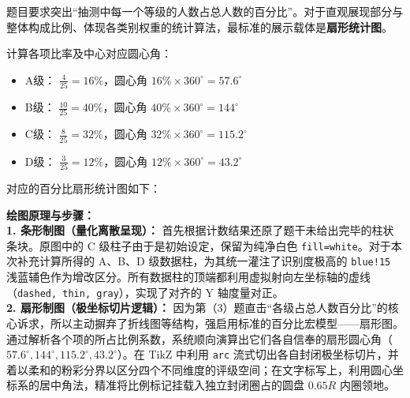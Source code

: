 题目要求突出“抽测中每一个等级的人数占总人数的百分比”。对于直观展现部分与整体构成比例、体现各类别权重的统计算法，最标准的展示载体是\textbf{扇形统计图}。

计算各项比率及中心对应圆心角：
\begin{itemize}
    \item A级： $\frac{4}{25} = 16\%$，圆心角 $16\% \times 360^\circ = 57.6^\circ$
    \item B级： $\frac{10}{25} = 40\%$，圆心角 $40\% \times 360^\circ = 144^\circ$
    \item C级： $\frac{8}{25} = 32\%$，圆心角 $32\% \times 360^\circ = 115.2^\circ$
    \item D级： $\frac{3}{25} = 12\%$，圆心角 $12\% \times 360^\circ = 43.2^\circ$
\end{itemize}

对应的百分比扇形统计图如下：
\begin{center}
\end{center}

\vspace{0.4cm}
{\small\color{blue!70!black}
\textbf{绘图原理与步骤：}\\
\textbf{1. 条形制图（量化离散呈现）：} 首先根据计数结果还原了题干未给出完毕的柱状条块。原图中的 C 级柱子由于是初始设定，保留为纯净白色 \texttt{fill=white}。对于本次补充计算所得的 A$、$B$、$D 级数据柱，为其统一灌注了识别度极高的 \texttt{blue!15} 浅蓝辅色作为增改区分。所有数据柱的顶端都利用虚拟射向左坐标轴的虚线（\texttt{dashed, thin, gray}），实现了对齐的 Y 轴度量对正。\\
\textbf{2. 扇形制图（极坐标切片逻辑）：} 因为第（3）题直击“各级占总人数百分比”的核心诉求，所以主动摒弃了折线图等结构，强启用标准的百分比宏模型——扇形图。通过解析各个项的所占比例系数，系统顺向演算出它们各自信奉的扇形圆心角（$57.6^\circ, 144^\circ, 115.2^\circ, 43.2^\circ$）。在 TikZ 中利用 \texttt{arc} 流式切出各自封闭极坐标切片，并着以柔和的粉彩分界以区分四个不同维度的评级空间；在文字标写上，利用圆心坐标系的居中角法，精准将比例标记挂载入独立封闭圈占的圆盘 $0.65R$ 内圈领地。
}

